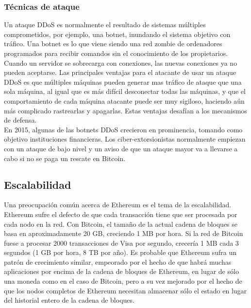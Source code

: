 \documentclass[11pt,a4paper]{article}
\begin{document}
\subsubsection{Técnicas de ataque}
Un ataque DDoS es normalmente el resultado de sistemas múltiples comprometidos, por ejemplo, una botnet, inundando el sistema objetivo con tráfico. Una botnet es lo que viene siendo una red zombie de ordenadores programados para recibir comandos sin el conocimiento de los propietarios. Cuando un servidor se sobrecarga con conexiones, las nuevas conexiones ya no pueden aceptarse. Las principales ventajas para el atacante de usar un ataque DDoS es que múltiples máquinas pueden generar mas tráfico de ataque que una sola máquina, al igual que es más difícil desconectar todas las máquinas, y que el comportamiento de cada máquina atacante puede ser muy sigiloso, haciendo aún más complicado rastrearlas y apagarlas. Estas ventajas desafían a los mecanismos de defensa.\\

En 2015, algunas de las botnets DDoS crecieron en prominencia, tomando como objetivo
instituciones financieras. Los ciber-extorsionistas normalmente empiezan con un ataque de bajo nivel y un aviso de que un ataque mayor va a llevarse a cabo si no se paga un rescate en Bitcoin.\\

\subsection{Escalabilidad}
\label{sec:escalabilidad}

Una preocupación común acerca de Ethereum es el tema de la escalabilidad. Ethereum sufre el defecto de que cada transacción tiene que ser procesada por cada nodo en la red. Con Bitcoin, el tamaño de la actual cadena de bloques se basa en aproximadamente 20 GB, creciendo 1 MB por hora. Si la red de Bitcoin fuese a procesar 2000 transacciones de Visa por segundo, crecería 1 MB cada 3 segundos (1 GB por hora, 8 TB por año). Es probable que Ethereum sufra un patrón de crecimiento similar, empeorado por el hecho de que habrá muchas aplicaciones por encima de la cadena de bloques de Ethereum, en lugar de sólo una moneda como en el caso de Bitcoin, pero a su vez mejorado por el hecho de que los nodos completos de Ethereum necesitan almacenar sólo el estado en lugar del historial entero de la cadena de bloques.\\
\end{document}
